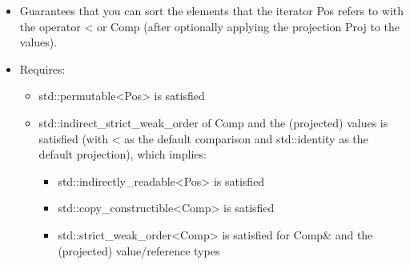 \begin{itemize}
\item
Guarantees that you can sort the elements that the iterator Pos refers to with the operator < or Comp (after optionally applying the projection Proj to the values).

\item
Requires:
\begin{itemize}
\item
std::permutable<Pos> is satisfied

\item
std::indirect\_strict\_weak\_order of Comp and the (projected) values is satisfied (with < as the default comparison and std::identity as the default projection), which implies:

\begin{itemize}
\item
std::indirectly\_readable<Pos> is satisfied

\item
std::copy\_constructible<Comp> is satisfied

\item
std::strict\_weak\_order<Comp> is satisfied for Comp\& and the (projected) value/reference types
\end{itemize}
\end{itemize}
\end{itemize}

























